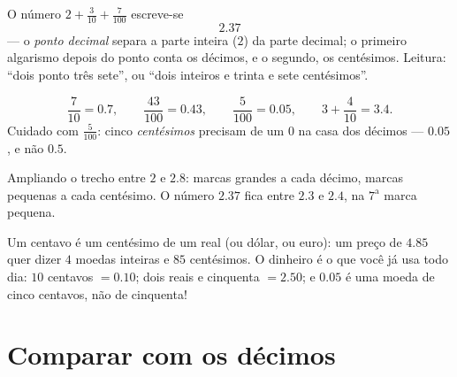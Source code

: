 \begin{definition}\label{def:g4:decimals:point}
O número $2 + \frac{3}{10} + \frac{7}{100}$ escreve-se
\[
2.37
\]
--- o \emph{ponto decimal} separa a parte inteira ($2$) da parte
decimal; o primeiro algarismo depois do ponto conta os décimos, e o
segundo, os centésimos. Leitura: ``dois ponto três sete'', ou ``dois
inteiros e trinta e sete centésimos''.
\end{definition}

\begin{example}\label{ex:g4:decimals:convert}
\[
\frac{7}{10} = 0.7, \qquad
\frac{43}{100} = 0.43, \qquad
\frac{5}{100} = 0.05, \qquad
3 + \frac{4}{10} = 3.4 .
\]
Cuidado com $\frac{5}{100}$: cinco \emph{centésimos} precisam de um
$0$ na casa dos décimos --- $0.05$, e não $0.5$.
\end{example}

\begin{omfigure}

{\small Ampliando o trecho entre $2$ e $2.8$: marcas grandes a cada
décimo, marcas pequenas a cada centésimo. O número $2.37$ fica entre
$2.3$ e $2.4$, na $7^{\text{a}}$ marca pequena.}
\end{omfigure}

\begin{example}\label{ex:g4:decimals:money}
Um centavo é um centésimo de um real (ou dólar, ou euro): um preço
de $4.85$ quer dizer $4$ moedas inteiras e $85$ centésimos. O
dinheiro é o  que você já usa todo dia: $10$ centavos
$= 0.10$; dois reais e cinquenta $= 2.50$; e $0.05$ é uma moeda de
cinco centavos, não de cinquenta!
\end{example}

\section{Comparar com os décimos}

